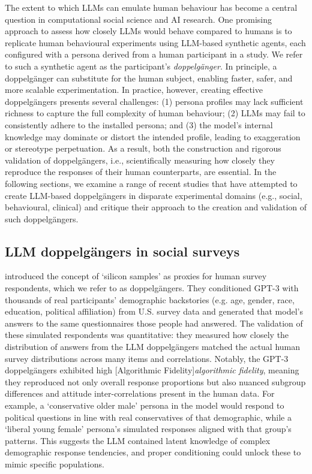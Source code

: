 The extent to which LLMs can emulate human behaviour has become a central question in computational social science and AI research. One promising approach to assess how closely LLMs would behave compared to humans is to replicate human behavioural experiments using LLM-based synthetic agents, each configured with a persona derived from a human participant in a study. We refer to such a synthetic agent as the participant's \emph{doppelgänger}. In principle, a doppelgänger can substitute for the human subject, enabling faster, safer, and more scalable experimentation. In practice, however, creating effective doppelgängers presents several challenges: (1) persona profiles may lack sufficient richness to capture the full complexity of human behaviour; (2) LLMs may fail to consistently adhere to the installed persona; and (3) the model's internal knowledge may dominate or distort the intended profile, leading to exaggeration or stereotype perpetuation. As a result, both the construction and rigorous validation of doppelgängers, i.e., scientifically measuring how closely they reproduce the responses of their human counterparts, are essential. In the following sections, we examine a range of recent studies that have attempted to create LLM-based doppelgängers in disparate experimental domains (e.g., social, behavioural, clinical) and critique their approach to the creation and validation of such doppelgängers.


\subsection{LLM doppelgängers in social surveys}

\cite{Argyle2023} introduced the concept of `silicon samples' as proxies for human survey respondents, which we refer to as doppelgängers. They conditioned GPT-3 with thousands of real participants' demographic backstories (e.g. age, gender, race, education, political affiliation) from U.S. survey data and generated that model's answers to the same questionnaires those people had answered. The validation of these simulated respondents was quantitative: they measured how closely the distribution of answers from the LLM doppelgängers matched the actual human survey distributions across many items and correlations. Notably, the GPT-3 doppelgängers exhibited high [Algorithmic Fidelity]\textit{algorithmic fidelity}, meaning they reproduced not only overall response proportions but also nuanced subgroup differences and attitude inter-correlations present in the human data. For example, a `conservative older male’ persona in the model would respond to political questions in line with real conservatives of that demographic, while a `liberal young female' persona’s simulated responses aligned with that group’s patterns. This suggests the LLM contained latent knowledge of complex demographic response tendencies, and proper conditioning could unlock these to mimic specific populations.

